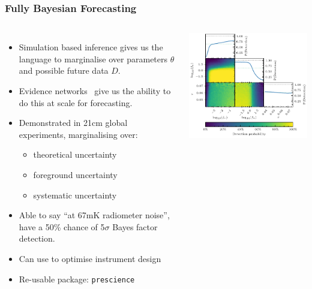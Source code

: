 \documentclass[aspectratio=169]{beamer}
\begin{document}
\begin{frame}
\begin{columns}[t]
    \end{columns}

\end{frame}


\begin{frame}
    \frametitle{Fully Bayesian Forecasting~}
    \begin{columns}
        \begin{itemize}
            \item Simulation based inference gives us the language to marginalise over parameters $\theta$ and possible future data $D$.
            \item Evidence networks~ give us the ability to do this at scale for forecasting.
            \item Demonstrated in 21cm global experiments, marginalising over:
                \begin{itemize}
                    \item theoretical uncertainty
                    \item foreground uncertainty
                    \item systematic uncertainty
                \end{itemize}
            \item Able to say ``at 67mK radiometer noise'', have a 50\% chance of 5$\sigma$ Bayes factor detection.
            \item Can use to optimise instrument design
            \item Re-usable package: \texttt{prescience}
        \end{itemize}
        \includegraphics[width=\textwidth]{figures/fbf.pdf}
    \end{columns}
\end{frame}
\end{document}
